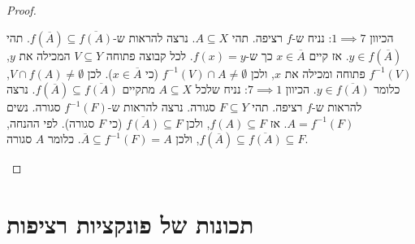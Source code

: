 \documentclass{tstextbook}
\begin{document}
\begin{proof}
\begin{itemize}
הכיוון \(1 \implies 7\): נניח ש-\(f\) רציפה. תהי \(A \subseteq X\). נרצה להראות ש-\(f(\overline{A}) \subseteq \overline{f(A)}\). תהי \(y \in f(\overline{A})\). אז קיים \(x \in \overline{A}\) כך ש-\(f(x) = y\). לכל קבוצה פתוחה \(V \subseteq Y\) המכילה את \(y\), \(f^{-1}(V)\) פתוחה ומכילה את \(x\), ולכן \(f^{-1}(V) \cap A \neq \emptyset\) (כי \(x \in \overline{A}\)). לכן \(V \cap f(A) \neq \emptyset\), כלומר \(y \in \overline{f(A)}\).
הכיוון \(7 \implies 1\): נניח שלכל \(A \subseteq X\) מתקיים \(f(\overline{A}) \subseteq \overline{f(A)}\). נרצה להראות ש-\(f\) רציפה. תהי \(F \subseteq Y\) סגורה. נרצה להראות ש-\(f^{-1}(F)\) סגורה. נשים \(A = f^{-1}(F)\). אז \(f(A) \subseteq F\), ולכן \(\overline{f(A)} \subseteq F\) (כי \(F\) סגורה). לפי ההנחה, \(f(\overline{A}) \subseteq \overline{f(A)} \subseteq F\), ולכן \(\overline{A} \subseteq f^{-1}(F) = A\). כלומר \(A\) סגורה.
  \end{itemize}
\end{proof}
\section{תכונות של פונקציות רציפות}
\end{document}
